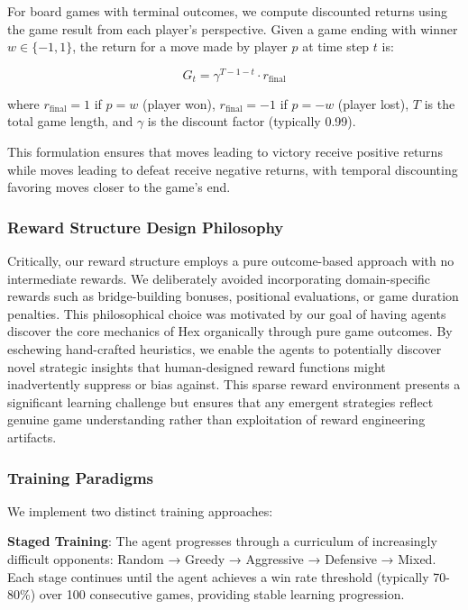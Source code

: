 \documentclass[conference]{IEEEtran}
\begin{document}
For board games with terminal outcomes, we compute discounted returns using the game result from each player's perspective. Given a game ending with winner $w \in \{-1, 1\}$, the return for a move made by player $p$ at time step $t$ is:

\begin{equation}
G_t = \gamma^{T-1-t} \cdot r_{\text{final}}
\end{equation}

where $r_{\text{final}} = 1$ if $p = w$ (player won), $r_{\text{final}} = -1$ if $p = -w$ (player lost), $T$ is the total game length, and $\gamma$ is the discount factor (typically 0.99).

This formulation ensures that moves leading to victory receive positive returns while moves leading to defeat receive negative returns, with temporal discounting favoring moves closer to the game's end.

\subsubsection{Reward Structure Design Philosophy}

Critically, our reward structure employs a pure outcome-based approach with no intermediate rewards. We deliberately avoided incorporating domain-specific rewards such as bridge-building bonuses, positional evaluations, or game duration penalties. This philosophical choice was motivated by our goal of having agents discover the core mechanics of Hex organically through pure game outcomes. By eschewing hand-crafted heuristics, we enable the agents to potentially discover novel strategic insights that human-designed reward functions might inadvertently suppress or bias against. This sparse reward environment presents a significant learning challenge but ensures that any emergent strategies reflect genuine game understanding rather than exploitation of reward engineering artifacts.

\subsubsection{Training Paradigms}

We implement two distinct training approaches:

\textbf{Staged Training}: The agent progresses through a curriculum of increasingly difficult opponents: Random → Greedy → Aggressive → Defensive → Mixed. Each stage continues until the agent achieves a win rate threshold (typically 70-80\%) over 100 consecutive games, providing stable learning progression.
\end{document}
